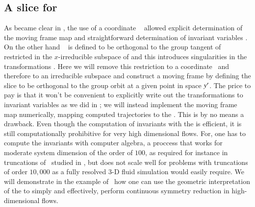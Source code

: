 
\subsection{\label{s:mfReqb} A slice for \cLe}

As became clear in , the use of a coordinate \slice\ 
allowed explicit determination of the moving frame map  and straightforward
determination of invariant variables .
On the other hand \slice\  is defined to be orthogonal
to the group tangent of  restricted in the $x$-irreducible subspace of 
and this introduces singularities in the transformations .
Here we will remove this restriction to a coordinate \slice\ and therefore to
an irreducible subspace and construct a moving frame by defining the slice to be orthogonal
to the group orbit at a given point in space ${y'}$. The price to pay is that it
won't be convenient to explicitly write out the transformations to invariant variables
as we did in ; we will instead implement the moving frame map numerically,
mapping computed trajectories to the \slice.
This is by no means a drawback. Even though the computation of invariants with the
{\mframes} is efficient, it is still computationally
prohibitive for very high dimensional flows. For, one has
to compute the invariants with computer algebra, a proccess
that works for moderate system dimension of the order of $100$,
as required for instance in truncations of \KSe\ studied in ,
but does not scale well for problems with truncations of order $10,000$ as
a fully resolved $3$-D fluid simulation would easily require.
We will demonstrate in the example of \cLe\
how one can use the geometric interpretation of the {\mframes}
to simply and effectively, perform continuous symmetry
reduction in high-dimensional flows.


